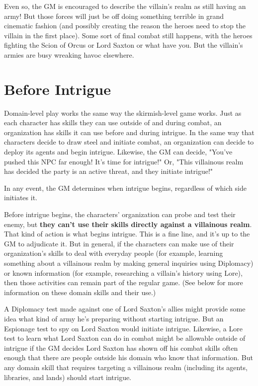 \documentclass[10pt,a4paper,twoside,bg=print,twocolumn,openany,nodeprecatedcode]{dndbook}
\begin{document}
Even so, the GM is encouraged to describe the villain's realm as still having an army! But those forces will just be off doing something terrible in grand cinematic fashion (and possibly creating the reason the heroes need to stop the villain in the first place). Some sort of final combat still happens, with the heroes fighting the Scion of Orcus or Lord Saxton or what have you. But the villain's armies are busy wreaking havoc elsewhere.

\section{Before Intrigue}
Domain-level play works the same way the skirmish-level game works. Just as each character has skills they can use outside of and during combat, an organization has skills it can use before and during intrigue. In the same way that characters decide to draw steel and initiate combat, an organization can decide to deploy its agents and begin intrigue. Likewise, the GM can decide, "You've pushed this NPC far enough! It's time for intrigue!" Or, "This villainous realm has decided the party is an active threat, and they initiate intrigue!"

In any event, the GM determines when intrigue begins, regardless of which side initiates it.

Before intrigue begins, the characters' organization can probe and test their enemy, but \textbf{they can't use their skills directly against a villainous realm}. That kind of action is what begins intrigue. This is a fine line, and it's up to the GM to adjudicate it. But in general, if the characters can make use of their organization's skills to deal with everyday people (for example, learning something about a villainous realm by making general inquiries using Diplomacy) or known information (for example, researching a villain's history using Lore), then those activities can remain part of the regular game. (See below for more information on these domain skills and their use.)

A Diplomacy test made against one of Lord Saxton's allies might provide some idea what kind of army he's preparing without starting intrigue. But an Espionage test to spy on Lord Saxton would initiate intrigue. Likewise, a Lore test to learn what Lord Saxton can do in combat might be allowable outside of intrigue if the GM decides Lord Saxton has shown off his combat skills often enough that there are people outside his domain who know that information. But any domain skill that requires targeting a villainous realm (including its agents, libraries, and lands) should start intrigue.
\end{document}
